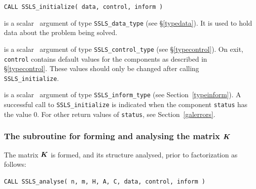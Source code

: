 \documentclass{galahad}
\newcommand{\packagename}{SSLS}
\begin{document}
\hspace{8mm}
{\tt CALL \packagename\_initialize( data, control, inform )}

\vspace*{-3mm}
\begin{description}

 is a scalar \intentinout\ argument of type
{\tt \packagename\_data\_type}
(see \S\ref{typedata}). It is used to hold data about the problem being
solved.

 is a scalar \intentout\ argument of type
{\tt \packagename\_control\_type}
(see \S\ref{typecontrol}).
On exit, {\tt control} contains default values for the components as
described in \S\ref{typecontrol}.
These values should only be changed after calling
{\tt \packagename\_initialize}.

 is a scalar \intentout\ argument of type
{\tt \packagename\_inform\_type}
(see Section~\ref{typeinform}). A successful call to
{\tt \packagename\_initialize}
is indicated when the  component {\tt status} has the value 0.
For other return values of {\tt status}, see Section~\ref{galerrors}.

\end{description}


\subsubsection{The subroutine for forming and analysing the matrix ${\bm{K}}$}
The matrix ${\bm{K}}$ is formed, and its structure analysed, prior to
factorization as follows:
\vspace*{1mm}

\hspace{8mm}
{\tt CALL \packagename\_analyse( n, m, H, A, C, data, control, inform )}
\end{document}
